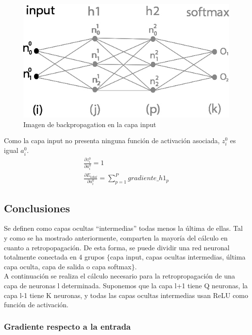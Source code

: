 \begin{figure}[H]
	\centering
	\includegraphics[scale=0.35]{imagenes/nn_2_capa_input.jpg}  
	\caption{Imagen de backpropagation en la capa input}
	\label{fig:nn_2_capa_input}
\end{figure}

Como la capa input no presenta ninguna función de activación asociada, $z^0_i$ es igual $a^0_i$. \\

\begin{gather}
	\frac{\partial z^0_i }{\partial a^0_i } = 1 \\
	\frac{\partial E_{total}}{\partial a^0_i} = \sum_{p=1}^{P} gradiente\_h1_p
\end{gather}

\subsection{Conclusiones}
Se definen como capas ocultas ``intermedias'' todas menos la última de ellas. Tal y como se ha mostrado anteriormente, comparten la mayoría del cálculo en cuanto a retropopagación. De esta forma, se puede dividir una red neuronal totalmente conectada en 4 grupos $\{$capa input, capas ocultas intermedias, última capa oculta, capa de salida o capa softmax$\}$. \\
A continuación se realiza el cálculo necesario para la retropropagación de una capa de neuronas l determinada. Suponemos que la capa l+1 tiene Q neuronas, la capa l-1 tiene K neuronas, y todas las capas ocultas intermedias usan ReLU como función de activación. \\

\subsubsection{Gradiente respecto a la entrada}

